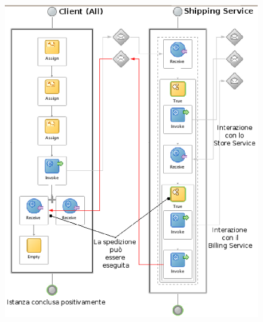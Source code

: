 \begin{figure}[p]
\begin{center}
  \includegraphics[scale=0.85,clip]{blide/dia/Sim1}
   \caption[]{}
  \label{fig:Sim1}
\end{center}
\end{figure}

